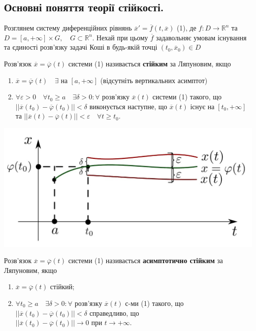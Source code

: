 \documentclass[14pt,a4paper]{scrartcl}
\theoremstyle{definition}
\theoremstyle{definition}
\theoremstyle{definition}
\begin{document}
\subsection{Основні поняття теорії стійкості.}
Розглянем систему диференційних рівнянь $\overline{x}' = \overline{f}(t, \overline{x})$ (1), де $f : D \rightarrow \mathbb{R}^n$ та $D = [a, +\infty] \times G, \quad G \subset \mathbb{R}^n$. Нехай при цьому $\overline{f}$ задавольняє умовам існування та єдиності розв'язку задачі Коші в будь-якій точці $(t_0, \overline{x}_0) \in D$

\bd
Розв'язок $\overline{x} = \overline{\varphi}(t)$ системи (1) називається \textbf{стійким} за Ляпуновим, якщо

\begin{enumerate}
  \item $\overline{x} = \overline{\varphi}(t) \quad \exists  \text{ на } [a, +\infty]$ (відсутніть вертикальних асимптот)
  \item $\forall \varepsilon > 0 \quad \forall t_0 \geq a \quad \exists \delta > 0 : \forall $ розв'язку $\overline{x}(t)$ системи (1) такого, що $||\overline{x}(t_0) - \overline{\varphi}(t_0)|| < \delta$ виконується наступне, що $\overline{x}(t)$ існує на $[t_0, +\infty]$ та $||\overline{x}(t) - \overline{\varphi}(t)|| < \varepsilon \quad \forall t \geq t_0$.
\end{enumerate}
\ed

\begin{center} \includegraphics[scale=0.35]{assets/lect1.jpg} \end{center}

\bd
Розв'язок $\overline{x} = \overline{\varphi}(t)$ системи (1) називається \textbf{асимптотично стійким} за Ляпуновим, якщо

\begin{enumerate}
  \item $\overline{x} = \overline{\varphi}(t)$ стійкий;
  \item $\forall t_0 \geq a \quad \exists \delta > 0: \forall$ розв'язку $\overline{x}(t)$ с-ми (1) такого, що $||\overline{x}(t_0) - \overline{\varphi}(t_0)|| < \delta$ справедливо, що $||\overline{x}(t_0) - \overline{\varphi}(t_0)|| \rightarrow 0 \text{ при } t \rightarrow + \infty$.
\end{enumerate}
\end{document}
